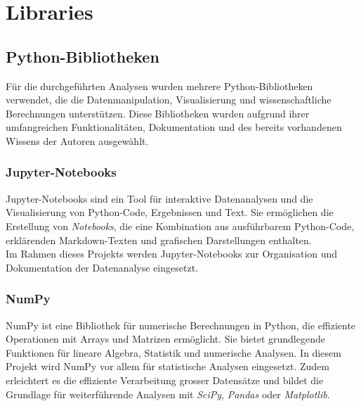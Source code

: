 

\chapter{Libraries} %

\label{AppendixA} %


\section{Python-Bibliotheken}
Für die durchgeführten Analysen wurden mehrere Python-Bibliotheken verwendet, die die Datenmanipulation, Visualisierung und wissenschaftliche Berechnungen unterstützen. Diese Bibliotheken wurden aufgrund ihrer umfangreichen Funktionalitäten, Dokumentation und des bereits vorhandenen Wissens der Autoren ausgewählt. 


\subsection{Jupyter-Notebooks}  
Jupyter-Notebooks sind ein Tool für interaktive Datenanalysen und die Visualisierung von Python-Code, Ergebnissen und Text. Sie ermöglichen die Erstellung von \textit{Notebooks}, die eine Kombination aus ausführbarem Python-Code, erklärenden Mark\-down-Texten und grafischen Darstellungen enthalten. \parencite{noauthor_project_nodate} \\
Im Rahmen dieses Projekts werden Jupyter-Notebooks zur Organisation und Dokumentation der Datenanalyse eingesetzt. 

\subsection{NumPy}
NumPy ist eine Bibliothek für numerische Berechnungen in Python, die effiziente Operationen mit Arrays und Matrizen ermöglicht. Sie bietet grundlegende Funktionen für lineare Algebra, Statistik und numerische Analysen. In diesem Projekt wird NumPy vor allem für statistische Analysen eingesetzt. Zudem erleichtert es die effiziente Verarbeitung grosser Datensätze und bildet die Grundlage für weiterführende Analysen mit \textit{SciPy}, \textit{Pandas} oder \textit{Matplotlib}. \parencite{noauthor_numpy_nodate} \parencite{noauthor_what_nodate}


